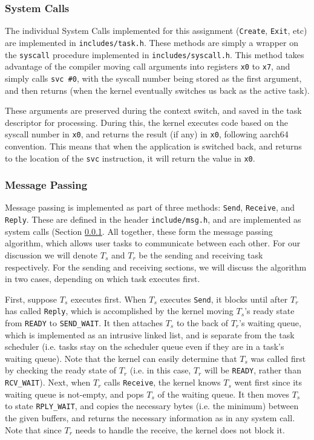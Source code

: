 \documentclass[12pt, titlepage]{article}
\begin{document}
    \subsubsection{System Calls}
    \label{sec:sys-calls}

    The individual System Calls implemented for this assignment (\verb`Create`, \verb`Exit`, etc) are implemented in \verb`includes/task.h`. These methods are simply a wrapper on the \verb`syscall` procedure implemented in \verb`includes/syscall.h`. This method takes advantage of the compiler moving call arguments into registers \verb`x0` to \verb`x7`, and simply calls \verb`svc #0`, with the syscall number being stored as the first argument, and then returns (when the kernel eventually switches us back as the active task).

    These arguments are preserved during the context switch, and saved in the task descriptor for processing. During this, the kernel executes code based on the syscall number in \verb`x0`, and returns the result (if any) in \verb`x0`, following aarch64 convention. This means that when the application is switched back, and returns to the location of the \verb`svc` instruction, it will return the value in \verb`x0`.

    \subsubsection{Message Passing}
    \label{sec:msg-passing}

    Message passing is implemented as part of three methods: \verb`Send`, \verb`Receive`, and \verb`Reply`. These are defined in the header \verb`include/msg.h`, and are implemented as system calls (Section \ref{sec:sys-calls}. All together, these form the message passing algorithm, which allows user tasks to communicate between each other. For our discussion we will denote $T_s$ and $T_r$ be the sending and receiving task respectively. For the sending and receiving sections, we will discuss the algorithm in two cases, depending on which task executes first.

    First, suppose $T_s$ executes first. When $T_s$ executes \verb`Send`, it blocks until after $T_r$ has called \verb`Reply`, which is accomplished by the kernel moving $T_s$'s ready state from \verb`READY` to \verb`SEND_WAIT`. It then attaches $T_s$ to the back of $T_r$'s waiting queue, which is implemented as an intrusive linked list, and is separate from the task scheduler (i.e. tasks stay on the scheduler queue even if they are in a task's waiting queue). Note that the kernel can easily determine that $T_s$ was called first by checking the ready state of $T_r$ (i.e. in this case, $T_r$ will be \verb`READY`, rather than \verb`RCV_WAIT`). Next, when $T_r$ calls \verb`Receive`, the kernel knows $T_s$ went first since its waiting queue is not-empty, and pops $T_s$ of the waiting queue. It then moves $T_s$ to state \verb`RPLY_WAIT`, and copies the necessary bytes (i.e. the minimum) between the given buffers, and returns the necessary information as in any system call. Note that since $T_r$ needs to handle the receive, the kernel does not block it.
\end{document}
